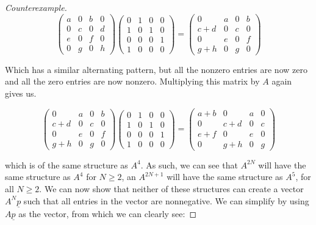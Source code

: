 \documentclass[
11pt, %
english, %
singlespacing, %
parskip, %
headsepline, %
]{amsart} %
\theoremstyle{definition}
\begin{document}
\begin{proof}[Counterexample]
$$
\begin{pmatrix}
a & 0 & b & 0 \\
0 & c & 0 & d \\
e & 0 & f & 0 \\
0 & g & 0 & h 
\end{pmatrix}
\begin{pmatrix}
0 & 1 & 0 & 0 \\
1 & 0 & 1 & 0 \\
0 & 0 & 0 & 1 \\
1 & 0 & 0 & 0
\end{pmatrix}
=
\begin{pmatrix}
0 & a & 0 & b \\
c+d & 0 & c & 0 \\
0 & e & 0 & f \\
g+h & 0 & g & 0 
\end{pmatrix}
$$

Which has a similar alternating pattern, but all the nonzero entries are now zero and all the zero entries are now nonzero. Multiplying this matrix by $A$ again gives us. 

$$
\begin{pmatrix}
0 & a & 0 & b \\
c+d & 0 & c & 0 \\
0 & e & 0 & f \\
g+h & 0 & g & 0 
\end{pmatrix}
\begin{pmatrix}
0 & 1 & 0 & 0 \\
1 & 0 & 1 & 0 \\
0 & 0 & 0 & 1 \\
1 & 0 & 0 & 0
\end{pmatrix}
=
\begin{pmatrix}
a+b & 0 & a & 0 \\
0 & c+d & 0 & c \\
e+f & 0 & e & 0 \\
0 & g+h & 0 & g 
\end{pmatrix}
$$

which is of the same structure as $A^4$. As such, we can see that $A^{2N}$ will have the same structure as $A^4$ for $N \geq 2$, an $A^{2N+1}$ will have the same structure as $A^5$, for all $N \geq 2$. We can now show that neither of these structures can create a vector $A^N \underline{p}$ such that all entries in the vector are nonnegative. We can simplify by using $A \underline{p}$ as the vector, from which we can clearly see:


\end{proof}
\end{document}
